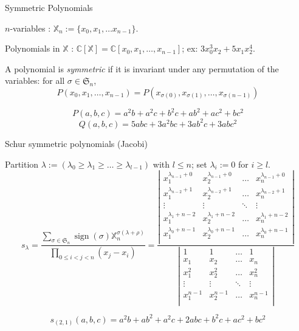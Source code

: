 \documentclass[compress,11pt]{beamer}
\newcommand{\XX}{{\mathbb X}}
\newcommand{\C}{{\mathbb C}}
\newcommand{\SG}{{\mathfrak S}}
\begin{document}
\begin{frame}{Symmetric Polynomials}

  $n$-variables : $\XX_n := \{x_0, x_1, \dots x_{n-1}\}$.

  Polynomials in $\XX$ : $\C[\XX] = \C[x_0, x_1, \dots, x_{n-1}]$; ex: $3x_0^3x_2
  + 5 x_1x_2^4$.

  \begin{DEFN}
    A polynomial is \emph{symmetric} if it is invariant under any permutation of the
    variables: for all $\sigma\in\SG_n$,
    \[P(x_0, x_1, \dots, x_{n-1}) = 
    P(x_{\sigma(0)}, x_{\sigma(1)}, \dots, x_{\sigma({n-1})})\]
  \end{DEFN}

  \[P(a,b,c) = a^2b + a^2c + b^2c + ab^2 + ac^2 + bc^2\]
  \[Q(a,b,c) = 5abc + 3a^2bc + 3ab^2c + 3abc^2\]

\end{frame}

\begin{frame}{Schur symmetric polynomials (Jacobi)}

  \begin{DEFN}
    \small Partition $\lambda :=
    (\lambda_0\geq\lambda_1\geq\dots\geq\lambda_{l-1})$ with $l\leq
    n$; set $\lambda_i:=0$ for $i\geq l$.
    \[
    s_{\lambda} = 
    \frac{\sum_{\sigma\in\SG_n} \operatorname{sign}(\sigma)
      \XX_n^{\sigma(\lambda+\rho)}}%
    {\prod_{0\leq i<j<n} (x_j - x_i)}
    = \frac{\left|
       \begin{smallmatrix}
         x_1^{\lambda_{n-1}+0}  & x_2^{\lambda_{n-1}+0}   & \dots  & x_n^{\lambda_{n-1}+0}  \\
         x_1^{\lambda_{n-2}+1}  & x_2^{\lambda_{n-2}+1}   & \dots  & x_n^{\lambda_{n-2}+1}  \\
         \vdots & \vdots & \ddots & \vdots \\
         x_1^{\lambda_1+n-2}  & x_2^{\lambda_1+n-2}   & \dots  & x_n^{\lambda_1+n-2}  \\
         x_1^{\lambda_0+n-1}  & x_2^{\lambda_0+n-1}   & \dots  & x_n^{\lambda_0+n-1}  \\
      \end{smallmatrix}
      \right|
    }{\left|
       \begin{smallmatrix}
         1      & 1      & \dots  & 1     \\
         x_1    & x_2    & \dots  & x_n    \\
         x_1^2  & x_2^2   & \dots  & x_n^2  \\
         \vdots & \vdots & \ddots & \vdots \\
         x_1^{n-1}  & x_2^{n-1}   & \dots  & x_n^{n-1}  \\
      \end{smallmatrix}
      \right|
    }
    \]
  \end{DEFN}
  \[s_{(2,1)}(a,b,c) = a^2b + ab^2 + a^2c + 2abc + b^2c + ac^2 + bc^2\]
\end{frame}
\end{document}
